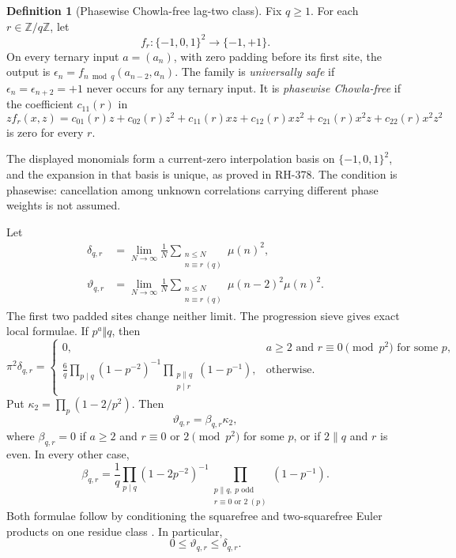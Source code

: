 \documentclass[11pt]{article}
\theoremstyle{definition}
\newtheorem{definition}[theorem]{Definition}
\theoremstyle{remark}
\newcommand{\mob}{\mu}
\newcommand{\TT}{\{-1,0,1\}}
\newcommand{\dd}{\delta}
\newcommand{\thh}{\vartheta}
\newcommand{\kap}{\kappa_2}
\newcommand{\Z}{\mathbb Z}
\begin{document}
\begin{definition}[Phasewise Chowla-free lag-two class]
Fix $q\ge1$.  For each $r\in\Z/q\Z$, let
\[
             f_r:\TT^2\longrightarrow\{-1,+1\}.
\]
On every ternary input $a=(a_n)$, with zero padding before its first site,
the output is $\epsilon_n=f_{n\bmod q}(a_{n-2},a_n)$.  The family is
\emph{universally safe} if $\epsilon_n=\epsilon_{n+2}=+1$ never occurs for
any ternary input.  It is \emph{phasewise Chowla-free} if the coefficient
$c_{11}(r)$ in
\begin{equation}
 zf_r(x,z)=c_{01}(r)z+c_{02}(r)z^2+c_{11}(r)xz+c_{12}(r)xz^2
            +c_{21}(r)x^2z+c_{22}(r)x^2z^2
 \label{eq:interpolation}
\end{equation}
is zero for every $r$.
\end{definition}

The displayed monomials form a current-zero interpolation basis on $\TT^2$,
and the expansion in that basis is unique, as proved in RH-378.  The
condition is phasewise: cancellation among
unknown correlations carrying different phase weights is not assumed.

Let
\begin{align}
 \dd_{q,r}&=\lim_{N\to\infty}\frac1N
   \sum_{\substack{n\le N\\n\equiv r\ (q)}}\mob(n)^2,
 \label{eq:delta-def}\\
 \thh_{q,r}&=\lim_{N\to\infty}\frac1N
   \sum_{\substack{n\le N\\n\equiv r\ (q)}}
   \mob(n-2)^2\mob(n)^2.
 \label{eq:theta-def}
\end{align}
The first two padded sites change neither limit.  The progression sieve
gives exact local formulae.  If $p^a\Vert q$, then
\begin{equation}
 \pi^2\dd_{q,r}=
 \begin{cases}
 0,&a\ge2\text{ and }r\equiv0\pmod{p^2}\text{ for some }p,\\[1mm]
 \displaystyle\frac6q\prod_{p\mid q}(1-p^{-2})^{-1}
  \prod_{\substack{p\parallel q\\p\mid r}}(1-p^{-1}),&\text{otherwise}.
 \end{cases}
 \label{eq:delta-local}
\end{equation}
Put $\kap=\prod_p(1-2/p^2)$.  Then
\begin{equation}
 \thh_{q,r}=\beta_{q,r}\kap,
 \label{eq:theta-local}
\end{equation}
where $\beta_{q,r}=0$ if $a\ge2$ and
$r\equiv0$ or $2\pmod{p^2}$ for some $p$, or if $2\parallel q$ and $r$ is
even.  In every other case,
\begin{equation}
 \beta_{q,r}=\frac1q\prod_{p\mid q}(1-2p^{-2})^{-1}
 \prod_{\substack{p\parallel q,\ p\text{ odd}\\r\equiv0\text{ or }2\ (p)}}
 (1-p^{-1}).
 \label{eq:beta-local}
\end{equation}
Both formulae follow by conditioning the squarefree and two-squarefree
Euler products on one residue class \cite{Mirsky1948}.  In particular,
\begin{equation}
                       0\le\thh_{q,r}\le\dd_{q,r}.
 \label{eq:density-cone}
\end{equation}
\end{document}
